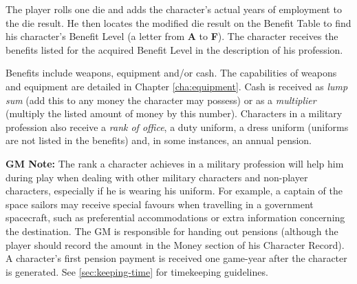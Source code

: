The player rolls one die and adds the character's actual years of
employment to the die result. He then locates the modified die result
on the Benefit Table to find his character's Benefit Level (a letter
from \textbf{A} to \textbf{F}). The character receives the benefits
listed for the acquired Benefit Level in the description of his
profession.

Benefits include weapons, equipment and/or cash. The capabilities of
weapons and equipment are detailed in Chapter \ref{cha:equipment}.
Cash is received as \emph{lump sum} (add this to any money the
character may possess) or as a \emph{multiplier} (multiply the listed
amount of money by this number). Characters in a military profession
also receive a \emph{rank of office}, a duty uniform, a dress uniform
(uniforms are not listed in the benefits) and, in some instances, an
annual pension.

\textbf{GM Note:} The rank a character achieves in a military
profession will help him during play when dealing with other military
characters and non-player characters, especially if he is wearing his
uniform. For example, a captain of the space sailors may receive
special favours when travelling in a government spacecraft, such as
preferential accommodations or extra information concerning the
destination. The GM is responsible for handing out pensions (although
the player should record the amount in the Money section of his
Character Record). A character's first pension payment is received one
game-year after the character is generated. See \ref{sec:keeping-time}
for timekeeping guidelines.


\begin{table}[htbp]
  \centering
\end{table}

